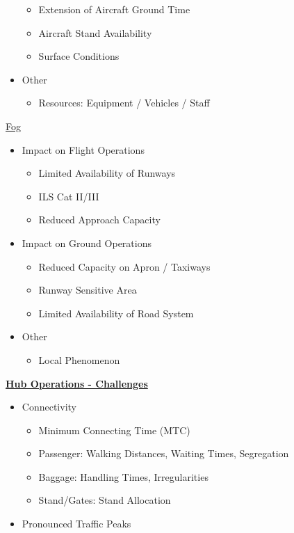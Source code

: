 \documentclass[9pt, landscape, fleqn]{scrartcl}
\begin{document}
\begin{multicols*}{3}
\begin{itemize}
\begin{itemize}
        \item Extension of Aircraft Ground Time
        \item Aircraft Stand Availability
        \item Surface Conditions
    \end{itemize} 
    \item Other 
    \begin{itemize}
        \item Resources: Equipment / Vehicles / Staff
    \end{itemize}
\end{itemize}
\underline{Fog}
\begin{itemize}
    \item Impact on Flight Operations 
    \begin{itemize}
        \item Limited Availability of Runways
        \item ILS Cat II/III
        \item Reduced Approach Capacity
    \end{itemize}
    \item Impact on Ground Operations
    \begin{itemize}
        \item Reduced Capacity on Apron / Taxiways
        \item Runway Sensitive Area
        \item Limited Availability of Road System
    \end{itemize} 
    \item Other 
    \begin{itemize}
        \item Local Phenomenon
    \end{itemize}
\end{itemize}
\underline{\textbf{Hub Operations - Challenges}}
\begin{itemize}
    \item Connectivity 
    \begin{itemize}
        \item Minimum Connecting Time (MTC)
        \item Passenger: Walking Distances, Waiting Times, Segregation 
        \item Baggage: Handling Times, Irregularities 
        \item Stand/Gates: Stand Allocation
    \end{itemize}
    \item Pronounced Traffic Peaks

\end{itemize}
\end{multicols*}
\end{document}
